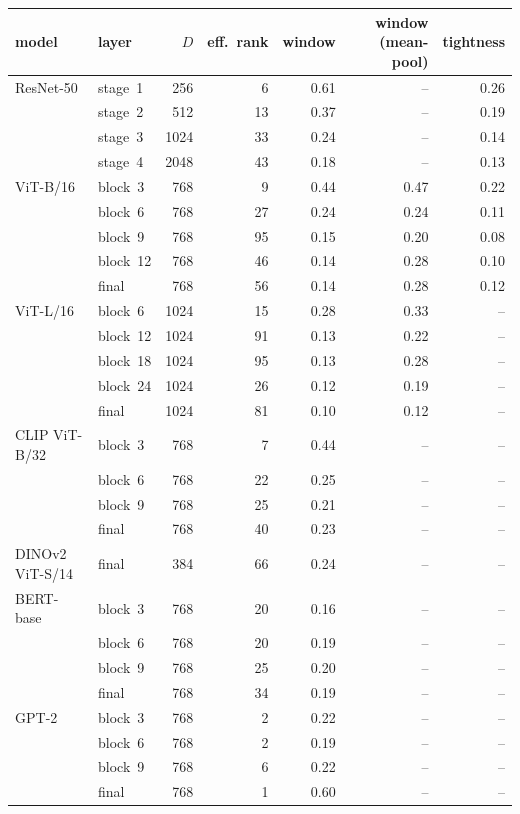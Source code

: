 \begin{tabular}{@{}llrrrrr@{}}
\toprule
model & layer & $D$ & eff.\ rank & window & window (mean-pool) & tightness\\
\midrule
ResNet-50 & stage~1 & 256 & 6 & 0.61 & -- & 0.26\\
 & stage~2 & 512 & 13 & 0.37 & -- & 0.19\\
 & stage~3 & 1024 & 33 & 0.24 & -- & 0.14\\
 & stage~4 & 2048 & 43 & 0.18 & -- & 0.13\\
ViT-B/16 & block~3 & 768 & 9 & 0.44 & 0.47 & 0.22\\
 & block~6 & 768 & 27 & 0.24 & 0.24 & 0.11\\
 & block~9 & 768 & 95 & 0.15 & 0.20 & 0.08\\
 & block~12 & 768 & 46 & 0.14 & 0.28 & 0.10\\
 & final & 768 & 56 & 0.14 & 0.28 & 0.12\\
ViT-L/16 & block~6 & 1024 & 15 & 0.28 & 0.33 & --\\
 & block~12 & 1024 & 91 & 0.13 & 0.22 & --\\
 & block~18 & 1024 & 95 & 0.13 & 0.28 & --\\
 & block~24 & 1024 & 26 & 0.12 & 0.19 & --\\
 & final & 1024 & 81 & 0.10 & 0.12 & --\\
CLIP ViT-B/32 & block~3 & 768 & 7 & 0.44 & -- & --\\
 & block~6 & 768 & 22 & 0.25 & -- & --\\
 & block~9 & 768 & 25 & 0.21 & -- & --\\
 & final & 768 & 40 & 0.23 & -- & --\\
DINOv2 ViT-S/14 & final & 384 & 66 & 0.24 & -- & --\\
BERT-base & block~3 & 768 & 20 & 0.16 & -- & --\\
 & block~6 & 768 & 20 & 0.19 & -- & --\\
 & block~9 & 768 & 25 & 0.20 & -- & --\\
 & final & 768 & 34 & 0.19 & -- & --\\
GPT-2 & block~3 & 768 & 2 & 0.22 & -- & --\\
 & block~6 & 768 & 2 & 0.19 & -- & --\\
 & block~9 & 768 & 6 & 0.22 & -- & --\\
 & final & 768 & 1 & 0.60 & -- & --\\
\bottomrule
\end{tabular}
